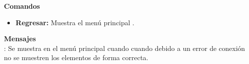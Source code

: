 \textbf{\textcolor[rgb]{0, 0, 0.545098}{Comandos}}
\begin{itemize}
	\item \textbf{\textcolor[rgb]{0, 0, 0.545098}{Regresar:}} Muestra el menú principal .
\end{itemize}

\vspace{1em}

\textbf{\textcolor[rgb]{0, 0, 0.545098}{Mensajes}}\\
	
\textbf{}: Se muestra en el menú principal  cuando cuando debido a un error de conexión no se muestren los elementos de forma correcta.\\

\clearpage